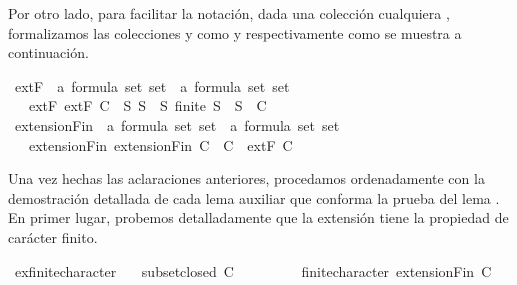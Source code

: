 \begin{isabellebody}
\begin{isamarkuptext}
  Por otro lado, para facilitar la notación, dada una colección cualquiera , formalizamos las 
  colecciones  y  como  y  respectivamente como se muestra a 
  continuación.%
\end{isamarkuptext}\isamarkuptrue%
\isamarkupfalse%
\ extF\ {\isacharcolon}{\isacharcolon}\ {\isachardoublequoteopen}{\isacharparenleft}{\isacharparenleft}{\isacharprime}a\ formula{\isacharparenright}\ set{\isacharparenright}\ set\ {\isasymRightarrow}\ {\isacharparenleft}{\isacharparenleft}{\isacharprime}a\ formula{\isacharparenright}\ set{\isacharparenright}\ set{\isachardoublequoteclose}\isanewline
\ \ \ extF{\isacharcolon}\ {\isachardoublequoteopen}extF\ C\ {\isacharequal}\ {\isacharbraceleft}S{\isachardot}\ {\isasymforall}S{\isacharprime}\ {\isasymsubseteq}\ S{\isachardot}\ finite\ S{\isacharprime}\ {\isasymlongrightarrow}\ S{\isacharprime}\ {\isasymin}\ C{\isacharbraceright}{\isachardoublequoteclose}\isanewline
\isanewline
{}\isamarkupfalse%
\ extensionFin\ {\isacharcolon}{\isacharcolon}\ {\isachardoublequoteopen}{\isacharparenleft}{\isacharparenleft}{\isacharprime}a\ formula{\isacharparenright}\ set{\isacharparenright}\ set\ {\isasymRightarrow}\ {\isacharparenleft}{\isacharparenleft}{\isacharprime}a\ formula{\isacharparenright}\ set{\isacharparenright}\ set{\isachardoublequoteclose}\isanewline
\ \ \ extensionFin{\isacharcolon}\ {\isachardoublequoteopen}extensionFin\ C\ {\isacharequal}\ C\ {\isasymunion}\ {\isacharparenleft}extF\ C{\isacharparenright}{\isachardoublequoteclose}%
\begin{isamarkuptext}%
Una vez hechas las aclaraciones anteriores, procedamos ordenadamente con la demostración 
  detallada de cada lema auxiliar que conforma la prueba del lema . En primer lugar, probemos 
  detalladamente que la extensión  tiene la propiedad de carácter finito.%
\end{isamarkuptext}\isamarkuptrue%
\isamarkupfalse%
\ ex{}{\isacharunderscore}finite{\isacharunderscore}character{\isacharcolon}\isanewline
\ \ \ {\isachardoublequoteopen}subset{\isacharunderscore}closed\ C{\isachardoublequoteclose}\isanewline
\ \ \ \ \ \ \ \ \ {\isachardoublequoteopen}finite{\isacharunderscore}character\ {\isacharparenleft}extensionFin\ C{\isacharparenright}{\isachardoublequoteclose}\isanewline

\end{isabellebody}
